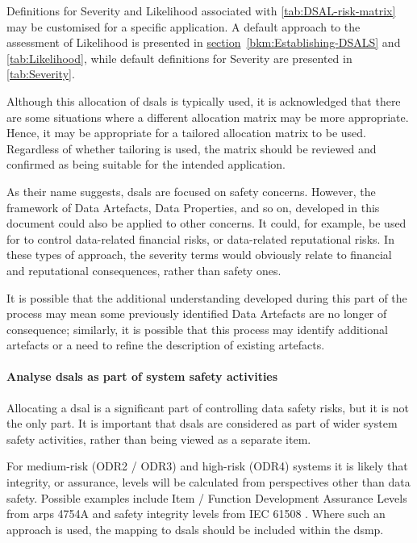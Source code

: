 Definitions for Severity and Likelihood associated with \autoref{tab:DSAL-risk-matrix} may be customised for a specific application. A default approach to the assessment of Likelihood is presented in
\hyperref[bkm:Establishing-DSALS]{section}~\ref{bkm:Establishing-DSALS} %
and \autoref{tab:Likelihood}, while default definitions for Severity are presented in \autoref{tab:Severity}.

Although this allocation of \glspl{dsal} is typically used, it is acknowledged that there are some situations where a different allocation matrix may be more appropriate. Hence, it may be appropriate for a tailored allocation matrix to be used. Regardless of whether tailoring is used, the matrix should be reviewed and confirmed as being suitable for the intended application.

As their name suggests, \glspl{dsal} are focused on safety concerns. However, the framework of Data Artefacts, Data Properties, and so on, developed in this document could also be applied to other concerns. It could, for example, be used for to control data-related financial risks, or data-related reputational risks. In these types of approach, the severity terms would obviously relate to financial and reputational consequences, rather than safety ones.

It is possible that the additional understanding developed during this part of the process may mean some previously identified Data Artefacts are no longer of consequence; similarly, it is possible that this process may identify additional artefacts or a need to refine the description of existing artefacts.

\paragraph{Analyse \glspl{dsal} as part of system safety activities}
\label{bkm:activities:analyse:partofsystemsafetyactivities}
Allocating a \gls{dsal} is a significant part of controlling data safety risks, but it is not the only part. It is important that \glspl{dsal} are considered as part of wider system safety activities, rather than being viewed as a separate item.

For medium-risk (ODR2 / ODR3) and high-risk (ODR4) systems it is likely that \gls{integrity}, or assurance, levels will be calculated from perspectives other than data safety. Possible examples include Item / Function Development Assurance Levels from \glspl{arp} 4754A \cite{citation:arp4754a2010guidelines} and safety \gls{integrity} levels from IEC 61508 \cite{citation:iec615083}.
Where such an approach is used, the mapping to \glspl{dsal} should be included within the \gls{dsmp}.


